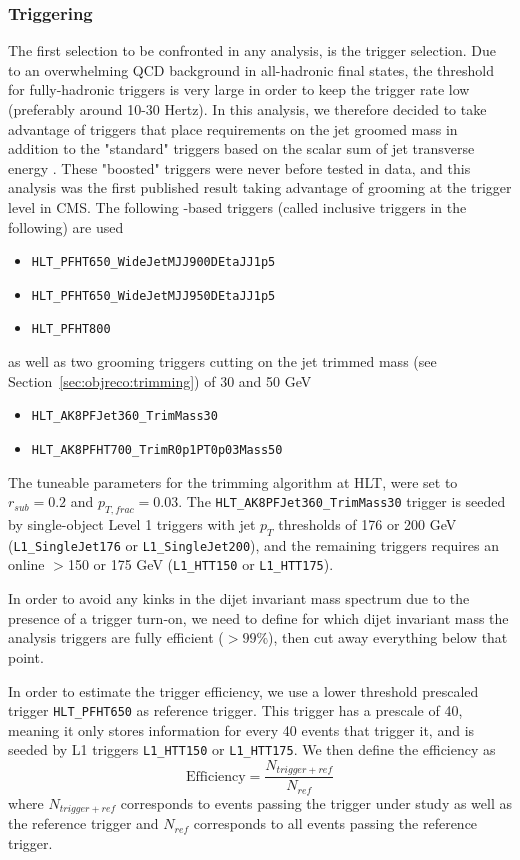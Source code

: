 \subsubsection{Triggering}
The first selection to be confronted in any analysis, is the trigger selection. Due to an overwhelming QCD background in all-hadronic final states, the threshold for fully-hadronic triggers is very large in order to keep the trigger rate low (preferably around 10-30 Hertz). In this analysis, we therefore decided to take advantage of triggers that place requirements on the jet groomed mass in addition to the "standard" triggers based on the scalar sum of jet transverse energy \HT. These "boosted" triggers were never before tested in data, and this analysis was the first published result taking advantage of grooming at the trigger level in CMS. The following \HT-based triggers (called inclusive triggers in the following) are used
\begin{itemize}
\item \texttt{HLT\_PFHT650\_WideJetMJJ900DEtaJJ1p5}
\item \texttt{HLT\_PFHT650\_WideJetMJJ950DEtaJJ1p5}
\item \texttt{HLT\_PFHT800}
\end{itemize}
as well as two grooming triggers cutting on the jet trimmed mass (see Section~\ref{sec:objreco:trimming}) of 30 and 50 GeV
\begin{itemize}
\item \texttt{HLT\_AK8PFJet360\_TrimMass30}
\item \texttt{HLT\_AK8PFHT700\_TrimR0p1PT0p03Mass50}
\end{itemize}
The tuneable parameters for the trimming algorithm at HLT, were set to $r_{sub}=0.2$ and $p_{T,frac}=0.03$. The \texttt{HLT\_AK8PFJet360\_TrimMass30} trigger is seeded by single-object Level 1 triggers with jet $p_T$ thresholds of 176 or 200 GeV (\texttt{L1\_SingleJet176} or \texttt{L1\_SingleJet200}), and the remaining triggers requires an online \HT{}$>$150 or 175 GeV (\texttt{L1\_HTT150} or \texttt{L1\_HTT175}).\par

In order to avoid any kinks in the dijet invariant mass spectrum due to the presence of a trigger turn-on, we need to define for which dijet invariant mass the analysis triggers are fully efficient ($>99\%$), then cut away everything below that point.

In order to estimate the trigger efficiency, we use a lower threshold prescaled \HT{} trigger \texttt{HLT\_PFHT650} as reference trigger. This trigger has a prescale of 40, meaning it only stores information for every 40 events that trigger it, and is seeded by L1 triggers \texttt{L1\_HTT150} or \texttt{L1\_HTT175}. We then define the efficiency as
\begin{equation*}
\textrm{Efficiency} = \frac{N_{trigger+ref}}{N_{ref}}  
\end{equation*}
where $N_{trigger+ref}$ corresponds to events passing the trigger under study as well as the reference trigger and $N_{ref}$ corresponds to all events passing the reference trigger.

